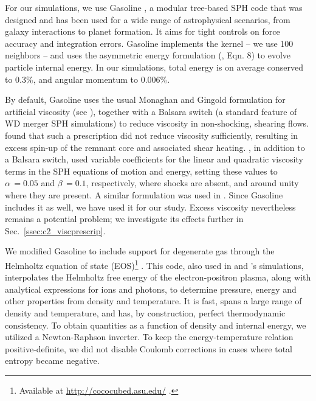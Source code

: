 For our simulations, we use Gasoline \citep{wadssq04}, a modular tree-based SPH code that was designed and has been used for a wide range of astrophysical scenarios, from galaxy interactions to planet formation.  It aims for tight controls on force accuracy and integration errors.  Gasoline implements the \cite{hernk89} kernel -- we use 100 neighbors -- and uses the asymmetric energy formulation (\citeauthor{wadssq04}, Eqn. 8) to evolve particle internal energy.  In our simulations, total energy is on average conserved to 0.3\%, and angular momentum to 0.006\%.

By default, Gasoline uses the usual Monaghan and Gingold formulation for artificial viscosity (see \citealt{mona05}), together with a Balsara switch (a standard feature of WD merger SPH simulations) to reduce viscosity in non-shocking, shearing flows.  \cite{guerig04} found that such a prescription did not reduce viscosity sufficiently, resulting in excess spin-up of the remnant core and associated shear heating.  \cite{yoonpr07}, in addition to a Balsara switch, used variable coefficients for the linear and quadratic viscosity terms in the SPH equations of motion and energy, setting these values to $\alpha\,=0.05$ and $\beta\,=0.1$, respectively, where shocks are absent, and around unity where they are present.  A similar formulation was used in \cite{dan+11,dan+12}.  Since Gasoline includes it as well, we have used it for our study.  Excess viscosity nevertheless remains a potential problem;  we investigate its effects further in Sec.~\ref{ssec:c2_viscprescrip}.

We modified Gasoline to include support for degenerate gas through the Helmholtz equation of state (EOS)\footnote{Available at \url{http://cococubed.asu.edu/} .} \citep{timms00}.  This code, also used in \cite{rask+12} and \cite{dan+12}'s simulations, interpolates the Helmholtz free energy of the electron-positron plasma, along with analytical expressions for ions and photons, to determine pressure, energy and other properties from density and temperature.  It is fast, spans a large range of density and temperature, and has, by construction, perfect thermodynamic consistency.  To obtain quantities as a function of density and internal energy, we utilized a Newton-Raphson inverter.  To keep the energy-temperature relation positive-definite, we did not disable Coulomb corrections in cases where total entropy became negative.


